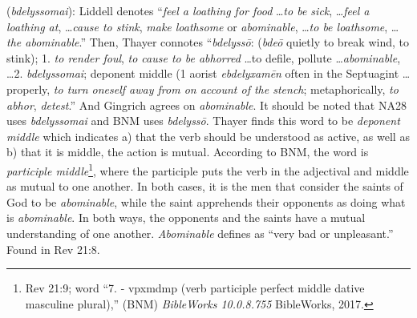 \item[Abominable,]

(\textit{bdelyssomai}):
Liddell denotes ``\emph{feel a loathing for food} \ldots \emph{to be sick}, \ldots \emph{feel a loathing at}, \ldots \emph{cause to stink}, \emph{make loathsome} or \emph{abominable}, \ldots \emph{to be loathsome}, \ldots \emph{the abominable}.'' 
Then, Thayer connotes ``\emph{bdelyssō}: (\emph{bdeō} quietly to break wind, to stink);  1. \emph{to render foul}, \emph{to cause to be abhorred} \ldots to defile, pollute \ldots \emph{abominable}, \ldots 2. \emph{bdelyssomai}; deponent middle (1 aorist \emph{ebdelyxamēn} often in the Septuagint \ldots properly, \emph{to turn oneself away from on account of the stench}; metaphorically, \emph{to abhor}, \emph{detest}.'' 
And Gingrich agrees on \textit{abominable}. 
It should be noted that NA28 uses \emph{bdelyssomai} and BNM uses  \emph{bdelyssō}. Thayer finds this word to be \emph{deponent middle} which indicates a) that the verb should be understood as active, as well as b) that it is middle, the action is mutual. According to BNM, the word is \emph{participle middle}\footnote{Rev 21:9; word ``7.   - vpxmdmp (verb participle perfect middle dative masculine plural),'' (BNM) \emph{BibleWorks 10.0.8.755} BibleWorks, 2017.}, where the participle puts the verb in the adjectival and middle as mutual to one another. In both cases, it is the men that consider the saints of God to be \emph{abominable}, while the saint apprehends their opponents as doing what is \emph{abominable}. In both ways, the opponents and the saints have a mutual understanding of one another. \textit{Abominable} defines as ``very bad or unpleasant.''
Found in Rev 21:8.

